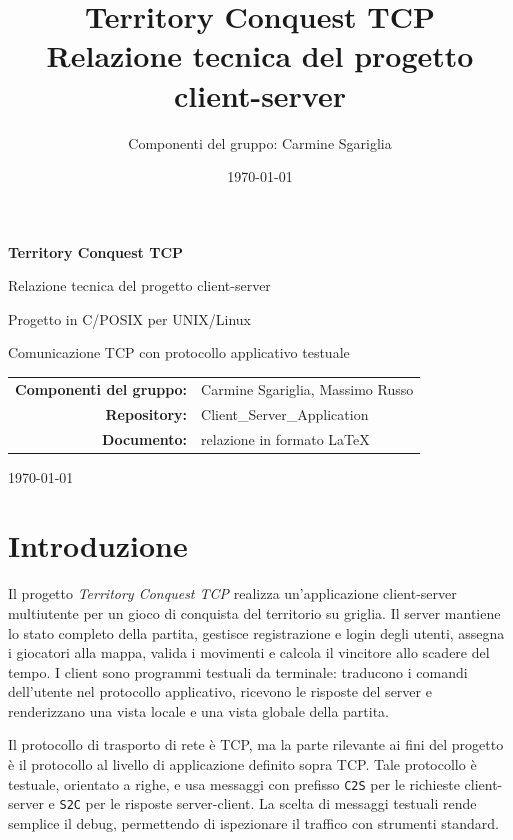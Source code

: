 \documentclass[11pt,a4paper]{article}
\title{\textbf{Territory Conquest TCP}\\
\large Relazione tecnica del progetto client-server}
\author{Componenti del gruppo: Carmine Sgariglia}
\date{\today}
\begin{document}
\begin{titlepage}
    \centering
    \vspace*{2cm}
    {\Huge\bfseries Territory Conquest TCP\par}
    \vspace{0.7cm}
    {\Large Relazione tecnica del progetto client-server\par}
    \vspace{1.8cm}
    {\large Progetto in C/POSIX per UNIX/Linux\par}
    \vspace{0.4cm}
    {\large Comunicazione TCP con protocollo applicativo testuale\par}
    \vfill
    \begin{tabular}{rl}
        \textbf{Componenti del gruppo:} & Carmine Sgariglia, Massimo Russo \\
        \textbf{Repository:} & Client\_Server\_Application \\
        \textbf{Documento:} & relazione in formato \LaTeX \\
    \end{tabular}
    \vfill
    {\large \today\par}
\end{titlepage}

\tableofcontents
\newpage

\section{Introduzione}

Il progetto \emph{Territory Conquest TCP} realizza un'applicazione client-server
multiutente per un gioco di conquista del territorio su griglia. Il server
mantiene lo stato completo della partita, gestisce registrazione e login degli
utenti, assegna i giocatori alla mappa, valida i movimenti e calcola il vincitore
allo scadere del tempo. I client sono programmi testuali da terminale: traducono
i comandi dell'utente nel protocollo applicativo, ricevono le risposte del
server e renderizzano una vista locale e una vista globale della partita.

Il protocollo di trasporto di rete è TCP, ma la parte rilevante ai fini del progetto è il
protocollo al livello di applicazione definito sopra TCP. Tale protocollo è
testuale, orientato a righe, e usa messaggi con prefisso \texttt{C2S} per le
richieste client-server e \texttt{S2C} per le risposte server-client. La scelta
di messaggi testuali rende semplice il debug, permettendo di ispezionare il traffico con strumenti standard.
\end{document}
